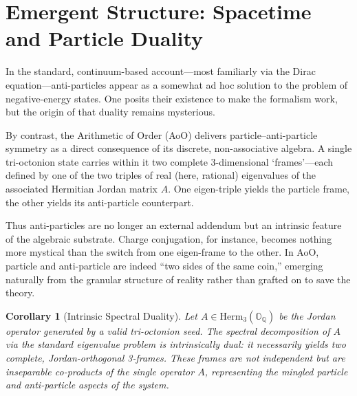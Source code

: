 \documentclass[11pt, a4paper]{article}
\newtheorem{corollary}[theorem]{Corollary}
\theoremstyle{definition}
\theoremstyle{remark}
\newcommand{\OQ}{\mathbb{O}_{\mathbb{Q}}}
\begin{document}
\section{Emergent Structure: Spacetime and Particle Duality}

In the standard, continuum-based account—most familiarly via the Dirac equation—anti-particles appear as a somewhat ad hoc solution to the problem of negative-energy states. One posits their existence to make the formalism work, but the origin of that duality remains mysterious.

By contrast, the Arithmetic of Order (AoO) delivers particle–anti-particle symmetry as a direct consequence of its discrete, non-associative algebra. A single tri-octonion state carries within it two complete 3-dimensional ‘frames’—each defined by one of the two triples of real (here, rational) eigenvalues of the associated Hermitian Jordan matrix $A$. One eigen-triple yields the particle frame, the other yields its anti-particle counterpart.

Thus anti-particles are no longer an external addendum but an intrinsic feature of the algebraic substrate. Charge conjugation, for instance, becomes nothing more mystical than the switch from one eigen-frame to the other. In AoO, particle and anti-particle are indeed “two sides of the same coin,” emerging naturally from the granular structure of reality rather than grafted on to save the theory.

\begin{corollary}[Intrinsic Spectral Duality]
Let $A \in \mathrm{Herm}_3(\OQ)$ be the Jordan operator generated by a valid tri-octonion seed. The spectral decomposition of $A$ via the standard eigenvalue problem is intrinsically dual: it necessarily yields two complete, Jordan-orthogonal 3-frames. These frames are not independent but are inseparable co-products of the single operator $A$, representing the mingled particle and anti-particle aspects of the system.
\end{corollary}
\end{document}
